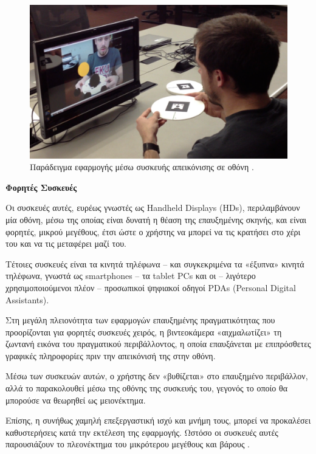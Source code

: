 \begin{figure}[H]
    \centering
    \includegraphics[scale=0.2, angle=0]{Files/Figures/monitor_example.png}
    \caption[Παράδειγμα εφαρμογής μέσω συσκευής απεικόνισης σε
οθόνη \cite{monitor_ar} .]{ Παράδειγμα εφαρμογής μέσω συσκευής απεικόνισης σε
οθόνη \cite{monitor_ar} .}
    \label{fig:monitor_example}
\end{figure}


\textbf{Φορητές Συσκευές}


Οι συσκευές αυτές, ευρέως γνωστές ως Handheld Displays (HDs), περιλαμβάνουν μία οθόνη, μέσω της οποίας είναι δυνατή η θέαση της επαυξημένης σκηνής, και είναι φορητές, μικρού μεγέθους, έτσι ώστε ο χρήστης να μπορεί να τις κρατήσει στο χέρι του και να τις μεταφέρει μαζί του. 

Τέτοιες συσκευές είναι τα κινητά τηλέφωνα – και συγκεκριμένα τα «έξυπνα» κινητά τηλέφωνα, γνωστά ως smartphones – τα tablet PCs και οι – λιγότερο χρησιμοποιούμενοι πλέον – προσωπικοί ψηφιακοί οδηγοί PDAs (Personal Digital Assistants). 

Στη μεγάλη πλειονότητα των εφαρμογών επαυξημένης πραγματικότητας που προορίζονται για φορητές συσκευές χειρός, η βιντεοκάμερα «αιχμαλωτίζει» τη ζωντανή εικόνα του πραγματικού περιβάλλοντος, η οποία επαυξάνεται με επιπρόσθετες γραφικές πληροφορίες πριν την απεικόνισή της στην οθόνη. 

Μέσω των συσκευών αυτών, ο χρήστης δεν «βυθίζεται» στο επαυξημένο περιβάλλον, αλλά το παρακολουθεί μέσω της οθόνης της συσκευής του, γεγονός το οποίο θα μπορούσε να θεωρηθεί ως μειονέκτημα. 

Επίσης, η συνήθως χαμηλή επεξεργαστική ισχύ και μνήμη τους, μπορεί να προκαλέσει καθυστερήσεις κατά την εκτέλεση της εφαρμογής. Ωστόσο οι συσκευές αυτές παρουσιάζουν το πλεονέκτημα του μικρότερου μεγέθους και βάρους \cite{wagner2007handheld} \cite{arth2015history} .

